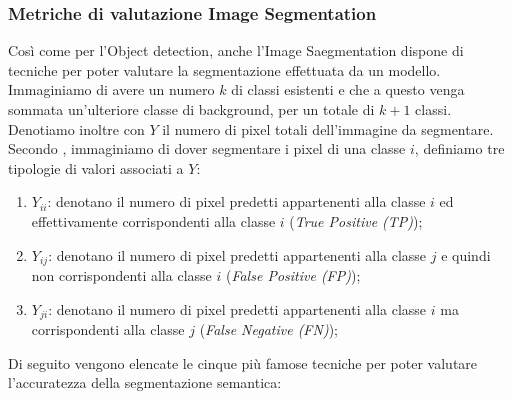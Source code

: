 \subsubsection{Metriche di valutazione Image Segmentation}
Così come per l’Object detection, anche l’Image Saegmentation dispone di tecniche 
per poter valutare la segmentazione effettuata da un modello. Immaginiamo di 
avere un numero $k$ di classi esistenti e che a questo venga sommata un’ulteriore 
classe di background, per un totale di $k+1$ classi. Denotiamo inoltre con $Y$ il 
numero di pixel totali dell’immagine da segmentare. Secondo \cite{metric_semantic_seg}, immaginiamo di dover segmentare i pixel di una classe $i$, definiamo tre 
tipologie di valori associati a $Y$:
\begin{enumerate}
    \item $Y_{ii}$: denotano il numero di pixel predetti appartenenti alla classe $i$ ed 
    effettivamente corrispondenti alla classe $i$ (\emph{True Positive (TP)});
    \item $Y_{ij}$: denotano il numero di pixel predetti appartenenti alla classe $j$ e quindi 
    non corrispondenti alla classe $i$ (\emph{False Positive (FP)});
    \item $Y_{ji}$: denotano il numero di pixel predetti appartenenti alla classe $i$ ma 
    corrispondenti alla classe $j$ (\emph{False Negative (FN)});
\end{enumerate}
Di seguito vengono elencate le cinque più famose tecniche per poter valutare 
l’accuratezza della segmentazione semantica:

